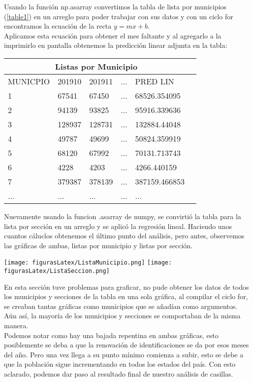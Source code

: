 \documentclass[12pt]{article}
\begin{document}
Usando la función np.asarray convertimos la tabla de lista por municipios (\ref{table1}) en un arreglo para poder trabajar con sus datos y con un ciclo for encontramos la ecuación de la recta $y=mx+b$.\\
Aplicamos esta ecuación para obtener el mes faltante y al agregarlo a la imprimirlo en pantalla obtenemos la predicción linear adjunta en la tabla:

\begin{center}
\begin{tabular}{ |p{3cm}||p{3cm}|p{3cm}|p{3cm}|p{3cm}|p{3cm}| }
 \hline
 \multicolumn{5}{|c|}{Listas por Municipio} \\
 \hline
 MUNICPIO  & 201910 & 201911 & ... & PRED LIN\\
 \hline
 1  & 67541  & 67450 & ...& 68526.354095\\
 2  &  94139 & 93825 & ...& 95916.339636\\
 3  & 128937 & 128731 & ...& 132884.44048\\
 4  & 49787  & 49699 & ...& 50824.359919\\
 5  & 68120  &  67992 & ...& 70131.713743\\
 6  & 4228   &  4203 & ...& 4266.440159\\
 7  & 379387 & 378139 & ...& 387159.466853\\
 ... & ... & ... & ... & ...\\
 \hline
\end{tabular}\label{table2.3}
\end{center}

Nuevamente usando la funcion .asarray de numpy, se convirtió la tabla para la lista por sección en un arreglo y se aplicó la regresión lineal. Haciendo unos cuantos cáluclos obtenemos el último punto del análisis, pero antes, observemos las gráficas de ambas, listas por municipio y listas por sección.

\begin{center}
\texttt{[image: figurasLatex/ListaMunicipio.png]}
\texttt{[image: figurasLatex/ListaSeccion.png]}  
\end{center}

En esta sección tuve problemas para graficar, no pude obtener los datos de todos los municipios y secciones de la tabla en una sola gráfica, al compilar el ciclo for, se creaban tantas gráficas como municipios que se añadían como argumentos. Aún así, la mayoría de los municipios y secciones se comportaban de la misma manera.\\
Podemos notar como hay una bajada repentina en ambas gráficas, esto posiblemente se deba a que la renovación de identificaciones se da por esos meses del año. Pero una vez llega a su punto mínimo comienza a subir, esto se debe a que la población sigue incrementando en todos los estados del país. Con esto aclarado, podemos dar paso al resultado final de nuestro análisis de casillas.\\
\end{document}
